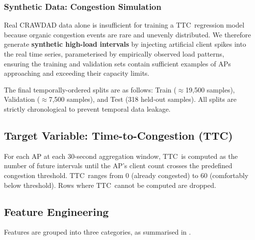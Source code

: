 \documentclass[12pt,a4paper]{article}
\newcommand{\ttc}{\textsc{TTC}}
\begin{document}
\subsubsection{Synthetic Data: Congestion Simulation}
Real CRAWDAD data alone is insufficient for training a \ttc\ regression model because organic congestion events are rare and unevenly distributed. We therefore generate \textbf{synthetic high-load intervals} by injecting artificial client spikes into the real time series, parameterised by empirically observed load patterns, ensuring the training and validation sets contain sufficient examples of APs approaching and exceeding their capacity limits.

The final temporally-ordered splits are as follows: Train ($\approx$19,500 samples), Validation ($\approx$7,500 samples), and Test (318 held-out samples). All splits are strictly chronological to prevent temporal data leakage.

\subsection{Target Variable: Time-to-Congestion (\ttc)}

For each AP at each 30-second aggregation window, \ttc\ is computed as the number of future intervals until the AP's client count crosses the predefined congestion threshold. \ttc\ ranges from 0 (already congested) to 60 (comfortably below threshold). Rows where \ttc\ cannot be computed are dropped.

\subsection{Feature Engineering}

Features are grouped into three categories, as summarised in .
\end{document}
